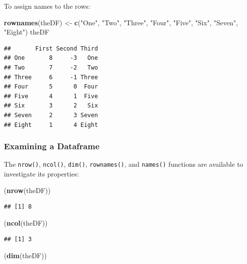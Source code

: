 \documentclass[]{book}
\newenvironment{Shaded}{\begin{snugshade}}{\end{snugshade}}
\newcommand{\KeywordTok}[1]{\textcolor[rgb]{0.13,0.29,0.53}{\textbf{#1}}}
\newcommand{\NormalTok}[1]{#1}
\newcommand{\StringTok}[1]{\textcolor[rgb]{0.31,0.60,0.02}{#1}}
\theoremstyle{definition}
\theoremstyle{definition}
\theoremstyle{definition}
\theoremstyle{remark}
\begin{document}
To assign names to the rows:

\begin{Shaded}
\begin{Highlighting}[]
\KeywordTok{rownames}\NormalTok{(theDF) <-}\StringTok{ }\KeywordTok{c}\NormalTok{(}\StringTok{"One"}\NormalTok{, }\StringTok{"Two"}\NormalTok{, }\StringTok{"Three"}\NormalTok{, }\StringTok{"Four"}\NormalTok{, }\StringTok{"Five"}\NormalTok{, }\StringTok{"Six"}\NormalTok{, }\StringTok{"Seven"}\NormalTok{, }\StringTok{"Eight"}\NormalTok{)}
\NormalTok{theDF}
\end{Highlighting}
\end{Shaded}

\begin{verbatim}
##       First Second Third
## One       8     -3   One
## Two       7     -2   Two
## Three     6     -1 Three
## Four      5      0  Four
## Five      4      1  Five
## Six       3      2   Six
## Seven     2      3 Seven
## Eight     1      4 Eight
\end{verbatim}

\hypertarget{examining-a-dataframe}{%
\subsubsection{Examining a Dataframe}\label{examining-a-dataframe}}

The \texttt{nrow()}, \texttt{ncol()}, \texttt{dim()},
\texttt{rownames()}, and \texttt{names()} functions are available to
investigate its properties:

\begin{Shaded}
\begin{Highlighting}[]
\NormalTok{(}\KeywordTok{nrow}\NormalTok{(theDF))}
\end{Highlighting}
\end{Shaded}

\begin{verbatim}
## [1] 8
\end{verbatim}

\begin{Shaded}
\begin{Highlighting}[]
\NormalTok{(}\KeywordTok{ncol}\NormalTok{(theDF))}
\end{Highlighting}
\end{Shaded}

\begin{verbatim}
## [1] 3
\end{verbatim}

\begin{Shaded}
\begin{Highlighting}[]
\NormalTok{(}\KeywordTok{dim}\NormalTok{(theDF))}
\end{Highlighting}
\end{Shaded}
\end{document}
